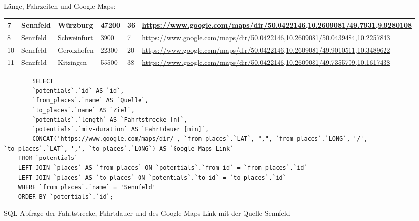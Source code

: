 Länge, Fahrzeiten und Google Maps:
\newline
\begin{tabular}{| l | l | l | l | l | l |}
    \hline
    7 & Sennfeld & Würzburg & 47200 & 36 & \href{https://www.google.com/maps/dir/50.0422146,10.2609081/49.7931,9.9280108}{https://www.google.com/maps/dir/50.0422146,10.2609081/49.7931,9.9280108}\\ 
    \hline
    8 & Sennfeld & Schweinfurt & 3900 & 7 & \href{https://www.google.com/maps/dir/50.0422146,10.2609081/50.0439484,10.2257843}{https://www.google.com/maps/dir/50.0422146,10.2609081/50.0439484,10.2257843}\\ 
    \hline
    10 & Sennfeld & Gerolzhofen & 22300 & 20 & \href{https://www.google.com/maps/dir/50.0422146,10.2609081/49.9010511,10.3489622}{https://www.google.com/maps/dir/50.0422146,10.2609081/49.9010511,10.3489622}\\ 
    \hline
    11 & Sennfeld & Kitzingen & 55500 & 38 & \href{https://www.google.com/maps/dir/50.0422146,10.2609081/49.7355709,10.1617438}{https://www.google.com/maps/dir/50.0422146,10.2609081/49.7355709,10.1617438}\\
    \hline
\end{tabular}    
\newline
\newline
\begin{listing}[htbp]
    \begin{verbatim}
        SELECT 
        `potentials`.`id` AS `id`, 
        `from_places`.`name` AS `Quelle`,
        `to_places`.`name` AS `Ziel`, 
        `potentials`.`length` AS `Fahrtstrecke [m]`, 
        `potentials`.`miv-duration` AS `Fahrtdauer [min]`,
        CONCAT('https://www.google.com/maps/dir/', `from_places`.`LAT`, ",", `from_places`.`LONG`, '/', `to_places`.`LAT`, ',', `to_places`.`LONG`) AS `Google-Maps Link`
    FROM `potentials`
    LEFT JOIN `places` AS `from_places` ON `potentials`.`from_id` = `from_places`.`id`
    LEFT JOIN `places` AS `to_places` ON `potentials`.`to_id` = `to_places`.`id`
    WHERE `from_places`.`name` = 'Sennfeld'
    ORDER BY `potentials`.`id`;
    \end{verbatim}
    \caption{SQL-Abfrage der Fahrtstrecke, Fahrtdauer und des Google-Maps-Link mit der Quelle Sennfeld}\label{lst-f-sennfeld}
\end{listing}